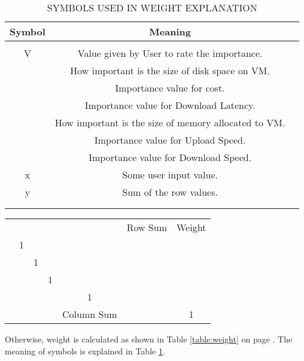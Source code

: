 \documentclass[journal]{IEEEtran}
\begin{document}
\begin{table}[!h]
\begin{center}\caption{SYMBOLS USED IN WEIGHT EXPLANATION } \label{table:weight_explanation_symbols}
\begin{tabular}{|c|c|c|}
\hline
\textbf{Symbol }&  \textbf{Meaning } \\
\hline  &  \\
\hline V & Value given by User to rate the importance. \\
\hline  & How important is the size of disk space on VM. \\
\hline  & Importance value for cost. \\
\hline  & Importance value for Download Latency. \\
\hline  & How important is the size of memory allocated to VM. \\
\hline  & Importance value for Upload Speed. \\
\hline  & Importance value for Download Speed. \\
\hline x & Some user input value. \\
\hline y & Sum of the row values. \\
\hline  &  \\
\hline  & \\
\hline
\end{tabular}
\end{center}
\end{table}


\begin{table*}
\begin{center}
\caption{MATRIX ILLUSTRATING HOW TO TURN PAIR-WISE PREFERENCE INTO GLOBAL WEIGHT}
\label{table:weight}
\begin{tabular}{ccccccc}
&  &  &  &  & Row Sum & Weight \\
 & 1 &  &  &  &  &   \\
 &  & 1  &  &  &  &   \\
 &  &  & 1 &  &  &  \\
 &  &  &  & 1 &  &  \\
& & & & Column Sum &  & 1\\
\end{tabular}
\end{center}
\end{table*}


Otherwise, weight is calculated as shown in Table \ref{table:weight} on page \pageref{table:weight}. 
The meaning of symbols is explained in Table \ref{table:weight_explanation_symbols}.
 
\end{document}
